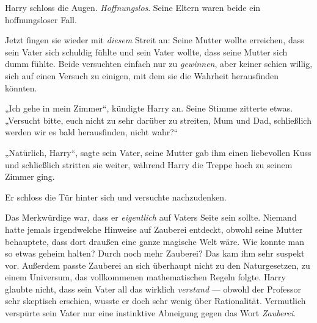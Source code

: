 Harry schloss die Augen. \emph{Hoffnungslos}. Seine Eltern waren beide ein hoffnungsloser Fall.

Jetzt fingen sie wieder mit \emph{diesem} Streit an: Seine Mutter wollte erreichen, dass sein Vater sich schuldig fühlte und sein Vater wollte, dass seine Mutter sich dumm fühlte. Beide versuchten einfach nur zu \emph{gewinnen}, aber keiner schien willig, sich auf einen Versuch zu einigen, mit dem sie die Wahrheit herausfinden könnten.

„Ich gehe in mein Zimmer“, kündigte Harry an. Seine Stimme zitterte etwas.
„Versucht bitte, euch nicht zu sehr darüber zu streiten, Mum und Dad, schließlich werden wir es bald herausfinden, nicht wahr?“

„Natürlich, Harry“, sagte sein Vater, seine Mutter gab ihm einen liebevollen Kuss und schließlich stritten sie weiter, während Harry die Treppe hoch zu seinem Zimmer ging.

Er schloss die Tür hinter sich und versuchte nachzudenken.

Das Merkwürdige war, dass er \emph{eigentlich} auf Vaters Seite sein sollte. Niemand hatte jemals irgendwelche Hinweise auf Zauberei entdeckt, obwohl seine Mutter behauptete, dass dort draußen eine ganze magische Welt wäre. Wie konnte man so etwas geheim halten? Durch noch mehr Zauberei? Das kam ihm sehr suspekt vor. Außerdem passte Zauberei an sich überhaupt nicht zu den Naturgesetzen, zu einem Universum, das vollkommenen mathematischen Regeln folgte. Harry glaubte nicht, dass sein Vater all das wirklich \emph{verstand} — obwohl der Professor sehr skeptisch erschien, wusste er doch sehr wenig über Rationalität. Vermutlich verspürte sein Vater nur eine instinktive Abneigung gegen das Wort \emph{Zauberei}.

